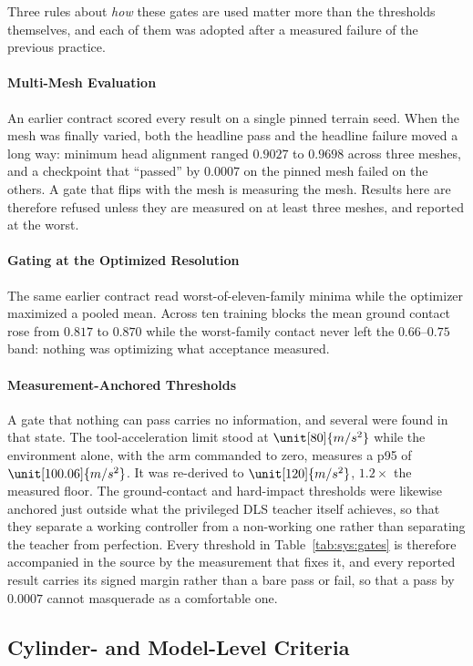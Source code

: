 Three rules about \emph{how} these gates are used matter more than the
thresholds themselves, and each of them was adopted after a measured
failure of the previous practice.

\paragraph{Multi-Mesh Evaluation}
An earlier contract scored every result on a single pinned terrain seed.
When the mesh was finally varied, both the headline pass and the headline failure moved a long way:
minimum head alignment ranged
$0.9027$ to $0.9698$ across three meshes, and a checkpoint that
``passed'' by $0.0007$ on the pinned mesh failed on the others. A gate
that flips with the mesh is measuring the mesh. Results here are
therefore refused unless they are measured on at least three meshes, and
reported at the worst.

\paragraph{Gating at the Optimized Resolution}
The same earlier contract read worst-of-eleven-family minima while the
optimizer maximized a pooled mean. Across ten training blocks the mean
ground contact rose from $0.817$ to $0.870$ while the worst-family
contact never left the $0.66$--$0.75$ band: nothing was optimizing what
acceptance measured.

\paragraph{Measurement-Anchored Thresholds}
A gate that nothing can pass carries no information, and several were found in that state. The tool-acceleration limit stood at
$\unit[80]{m/s^2}$ while the environment alone, with the arm commanded
to zero, measures a p95 of $\unit[100.06]{m/s^2}$. It was re-derived to
$\unit[120]{m/s^2}$, $1.2\times$ the measured floor. The ground-contact
and hard-impact thresholds were likewise anchored just outside what the
privileged DLS teacher itself achieves, so that they separate a working
controller from a non-working one rather than separating the teacher
from perfection. Every threshold in
Table~\ref{tab:sys:gates} is therefore accompanied in the source by the
measurement that fixes it, and every reported result carries its signed
margin rather than a bare pass or fail, so that a pass by $0.0007$
cannot masquerade as a comfortable one.

\subsection{Cylinder- and Model-Level Criteria}

